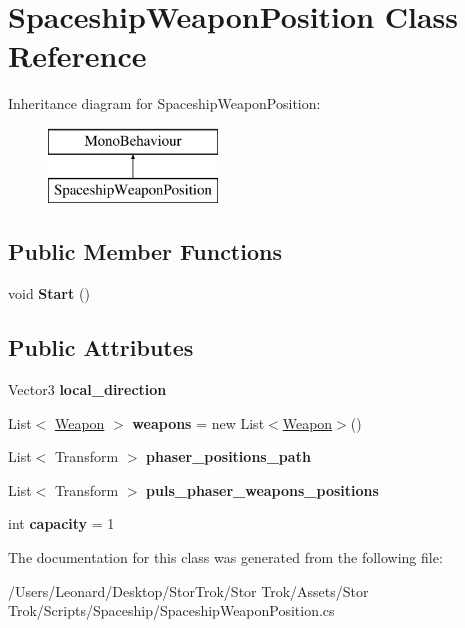 \hypertarget{class_spaceship_weapon_position}{}\section{Spaceship\+Weapon\+Position Class Reference}
\label{class_spaceship_weapon_position}
Inheritance diagram for Spaceship\+Weapon\+Position\+:\begin{figure}[H]
\begin{center}
\leavevmode
\includegraphics[height=2.000000cm]{class_spaceship_weapon_position}
\end{center}
\end{figure}
\subsection*{Public Member Functions}
\begin{DoxyCompactItemize}
\item 
\mbox{\label{class_spaceship_weapon_position_a86279434f649c207dca18a9dc93756ae}} 
void {\bfseries Start} ()
\end{DoxyCompactItemize}
\subsection*{Public Attributes}
\begin{DoxyCompactItemize}
\item 
\mbox{\label{class_spaceship_weapon_position_a98f71b83f2c17be129e2fc32874ce3f9}} 
Vector3 {\bfseries local\+\_\+direction}
\item 
\mbox{\label{class_spaceship_weapon_position_ad43c4417cd8f006ad3f55bc11d88046c}} 
List$<$ \hyperlink{class_weapon}{Weapon} $>$ {\bfseries weapons} = new List$<$\hyperlink{class_weapon}{Weapon}$>$()
\item 
\mbox{\label{class_spaceship_weapon_position_ae495a8c4722944e7021754f02181896b}} 
List$<$ Transform $>$ {\bfseries phaser\+\_\+positions\+\_\+path}
\item 
\mbox{\label{class_spaceship_weapon_position_ade86c81241713003e28804b304b38925}} 
List$<$ Transform $>$ {\bfseries puls\+\_\+phaser\+\_\+weapons\+\_\+positions}
\item 
\mbox{\label{class_spaceship_weapon_position_a8779dd904f2b80d58e03f2d20aa61fb5}} 
int {\bfseries capacity} = 1
\end{DoxyCompactItemize}


The documentation for this class was generated from the following file\+:\begin{DoxyCompactItemize}
\item 
/\+Users/\+Leonard/\+Desktop/\+Stor\+Trok/\+Stor Trok/\+Assets/\+Stor Trok/\+Scripts/\+Spaceship/Spaceship\+Weapon\+Position.\+cs\end{DoxyCompactItemize}

